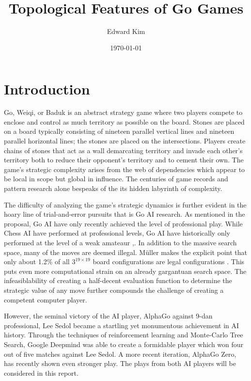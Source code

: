 \documentclass[11pt]{article}
\title{\vspace{-7ex}Topological Features of Go Games \vspace{-2ex}}
\author{Edward Kim}
\date{\vspace{-2ex}\today}
\begin{document}
\maketitle

\section{Introduction}
Go, Weiqi, or Baduk is an abstract strategy game where two players compete to enclose and control as much territory as possible on the board. Stones are placed on a board typically consisting of nineteen parallel vertical lines and  nineteen parallel horizontal lines; the stones are placed on the intersections. Players create chains of stones that act as a wall demarcating territory and invade each other's territory both to reduce their opponent's territory and to cement their own. The game's strategic complexity arises from the web of dependencies which appear to be local in scope but global in influence. The centuries of game records and pattern research alone bespeaks of the its hidden labyrinth of complexity.

The difficulty of analyzing the game's strategic dynamics is further evident in the hoary line of trial-and-error pursuits that is Go AI research. As mentioned in the proposal, Go AI have only recently achieved the level of professional play. While Chess AI have performed at professional levels, Go AI have historically only performed at the level of a weak amateaur \cite{bays},\cite{muller}. In addition to the massive search space, many of the moves are deemed illegal. M{\" u}ller  makes the explicit point that only about 1.2\% of all $3^{19 \times 19}$ board configurations are legal configurations \cite{muller}. This puts even more computational strain on an already gargantuan search space. The infeasiblability of creating a half-decent evaluation function to determine the strategic value of any move further compounds the challenge of creating a competent computer player.

However, the seminal victory of the AI player, AlphaGo against 9-dan professional, Lee Sedol became a startling yet monumentous achievement in AI history. Through the techniques of reinforcement learning and Monte-Carlo Tree Search, Google Deepmind was able to create a formidable player which won four out of five matches against Lee Sedol. \cite{alpha} A more recent iteration, AlphaGo Zero, has recently shown even stronger play. The plays from both AI players will be considered in this report.
\end{document}
